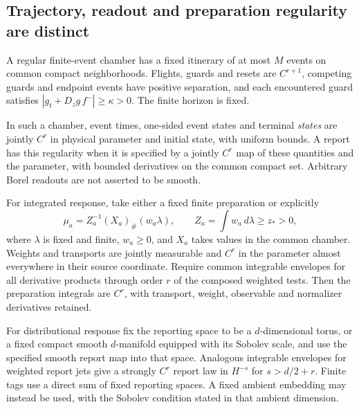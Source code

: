 \subsection{Trajectory, readout and preparation regularity are distinct}
A regular finite-event chamber has a fixed itinerary of at most $M$ events on common compact neighborhoods. Flights, guards and resets are $C^{r+1}$, competing guards and endpoint events have positive separation, and each encountered guard satisfies
$|g_t+D_zg\,f^-|\ge\kappa>0$. The finite horizon is fixed.

\begin{theorem}\label{thm:chamber-repair}
In such a chamber, event times, one-sided event states and terminal \emph{states} are jointly $C^r$ in physical parameter and initial state, with uniform bounds. A report has this regularity when it is specified by a jointly $C^r$ map of these quantities and the parameter, with bounded derivatives on the common compact set. Arbitrary Borel readouts are not asserted to be smooth.

For integrated response, take either a fixed finite preparation or explicitly
\[
 \mu_a=Z_a^{-1}(X_a)_\#(w_a\lambda),\qquad
 Z_a=\int w_a\,d\lambda\ge z_*>0,
\]
where $\lambda$ is fixed and finite, $w_a\ge0$, and $X_a$ takes values in the common chamber. Weights and transports are jointly measurable and $C^r$ in the parameter almost everywhere in their source coordinate. Require common integrable envelopes for all derivative products through order $r$ of the composed weighted tests. Then the preparation integrals are $C^r$, with transport, weight, observable and normalizer derivatives retained.

For distributional response fix the reporting space to be a $d$-dimensional torus, or a fixed compact smooth $d$-manifold equipped with its Sobolev scale, and use the specified smooth report map into that space. Analogous integrable envelopes for weighted report jets give a strongly $C^r$ report law in $H^{-s}$ for $s>d/2+r$. Finite tags use a direct sum of fixed reporting spaces. A fixed ambient embedding may instead be used, with the Sobolev condition stated in that ambient dimension.
\end{theorem}
